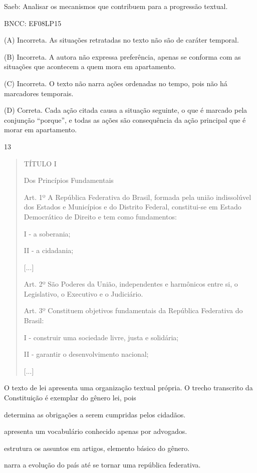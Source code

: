 Saeb: Analisar os mecanismos que contribuem para a progressão textual.

BNCC: EF08LP15

(A) Incorreta. As situações retratadas no texto não são de caráter
temporal.

(B) Incorreta. A autora não expressa preferência, apenas se conforma com
as situações que acontecem a quem mora em apartamento.

(C) Incorreta. O texto não narra ações ordenadas no tempo, pois não há
marcadores temporais.

(D) Correta. Cada ação citada causa a situação seguinte, o que é marcado
pela conjunção ``porque'', e todas as ações são consequência da ação
principal que é morar em apartamento.

\num{13}

\begin{quote}
TÍTULO I

Dos Princípios Fundamentais

Art. 1º A República Federativa do Brasil, formada pela união
indissolúvel dos Estados e Municípios e do Distrito Federal,
constitui-se em Estado Democrático de Direito e tem como fundamentos:

I - a soberania;

II - a cidadania;

{[}...{]}

Art. 2º São Poderes da União, independentes e harmônicos entre si, o
Legislativo, o Executivo e o Judiciário.

Art. 3º Constituem objetivos fundamentais da República Federativa do
Brasil:

I - construir uma sociedade livre, justa e solidária;

II - garantir o desenvolvimento nacional;

{[}...{]}
\end{quote}

O texto de lei apresenta uma organização textual própria. O trecho
transcrito da Constituição é exemplar do gênero lei, pois

\begin{escolha}
\item determina as obrigações a serem cumpridas pelos cidadãos.

\item apresenta um vocabulário conhecido apenas por advogados.

\item estrutura os assuntos em artigos, elemento básico do gênero.

\item narra a evolução do país até se tornar uma república federativa.
\end{escolha}


